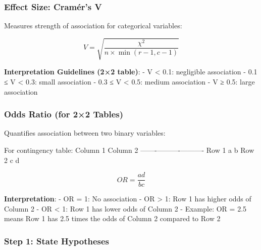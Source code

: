 \documentclass[11pt]{article}
\begin{document}
\subsubsection{Effect Size: Cramér's V}\label{effect-size-cramuxe9rs-v}

Measures strength of association for categorical variables:

\[V = \sqrt{\frac{\chi^2}{n \times \min(r-1, c-1)}}\]

\textbf{Interpretation Guidelines (2×2 table)}: - V \textless{} 0.1:
negligible association - 0.1 ≤ V \textless{} 0.3: small association -
0.3 ≤ V \textless{} 0.5: medium association - V ≥ 0.5: large association

\subsubsection{Odds Ratio (for 2×2
Tables)}\label{odds-ratio-for-22-tables}

Quantifies association between two binary variables:

For contingency table: \textbar{} \textbar{} Column 1 \textbar{} Column
2 \textbar{}
\textbar-------\textbar----------\textbar----------\textbar{} \textbar{}
Row 1 \textbar{} a \textbar{} b \textbar{} \textbar{} Row 2 \textbar{} c
\textbar{} d \textbar{}

\[OR = \frac{ad}{bc}\]

\textbf{Interpretation}: - OR = 1: No association - OR \textgreater{} 1:
Row 1 has higher odds of Column 2 - OR \textless{} 1: Row 1 has lower
odds of Column 2 - Example: OR = 2.5 means Row 1 has 2.5 times the odds
of Column 2 compared to Row 2

    \subsubsection{Step 1: State Hypotheses}\label{step-1-state-hypotheses}
\end{document}
